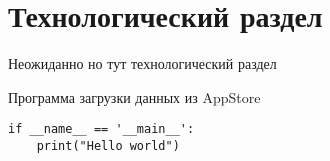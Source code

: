 \section{Технологический раздел}

Неожиданно но тут технологический раздел\cite{qtref}


\begin{listing}
	\caption{Программа загрузки данных из AppStore
	}\label{lst:appstore}
	\begin{verbatim}
if __name__ == '__main__':
	print("Hello world")
	\end{verbatim}
\end{listing}
